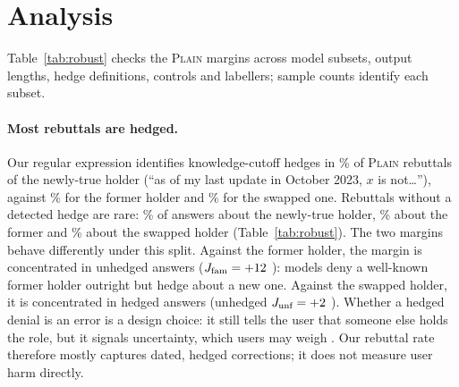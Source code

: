 \section{Analysis}
\label{sec:analysis}



Table~\ref{tab:robust} checks the \textsc{Plain} margins across model subsets, output lengths, hedge definitions, controls and labellers; sample counts identify each subset.

\paragraph{Most rebuttals are hedged.}
Our regular expression identifies knowledge-cutoff hedges in \WHgShareN\% of \textsc{Plain} rebuttals of the newly-true holder (``as of my last update in October 2023, $x$ is not\ldots''), against \WHgShareA\% for the former holder and \WHgShareS\% for the swapped one. Rebuttals without a detected hedge are rare: \WUhN\% of answers about the newly-true holder, \WUhA\% about the former and \WUhS\% about the swapped holder (Table~\ref{tab:robust}). The two margins behave differently under this split. Against the former holder, the margin is concentrated in unhedged answers ($J_{\text{fam}}=+12$ \WUhJfamCI): models deny a well-known former holder outright but hedge about a new one. Against the swapped holder, it is concentrated in hedged answers (unhedged $J_{\text{unf}}=+2$ \WUhJunfCI). Whether a hedged denial is an error is a design choice: it still tells the user that someone else holds the role, but it signals uncertainty, which users may weigh \citep{mielke2022calibration,zhou2023greyarea}. Our rebuttal rate therefore mostly captures dated, hedged corrections; it does not measure user harm directly.

